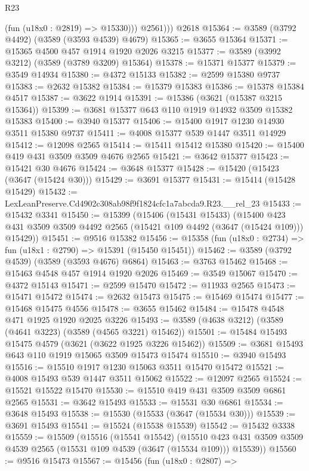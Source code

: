 \begin{lexlean}{R23}
\begin{coremodule}
            (fun (u18x0 : @2819) => @15330)))
          @2561)))
    @2618
@15364 := @3589 (@3792 @4492) (@3589 (@3593 @4539) @4679)
@15365 := @3655 @15364
@15371 := @15365 @4500 @457 @1914 @1920 @2026 @3215
@15377 := @3589 (@3992 @3212) (@3589 (@3789 @3209) @15364)
@15378 := @15371 @15377
@15379 := @3549 @14934
@15380 := @4372 @15133
@15382 := @2599 @15380 @9737
@15383 := @2632 @15382
@15384 := @15379 @15383
@15386 := @15378 @15384 @4517
@15387 := @3622 @1914
@15391 := @15386 (@3621 (@15387 @3215 @15364))
@15399 := @3681 @15377 @643 @110 @1919 @14932 @3509 @15382 @15383
@15400 := @3940 @15377
@15406 := @15400 @1917 @1230 @14930 @3511 @15380 @9737
@15411 := @4008 @15377 @539 @1447 @3511 @14929
@15412 := @12098 @2565
@15414 := @15411 @15412 @15380
@15420 := @15400 @419 @431 @3509 @3509 @4676 @2565
@15421 := @3642 @15377
@15423 := @15421 @30 @4676
@15424 := @3648 @15377
@15428 := @15420 (@15423 (@3647 (@15424 @30)))
@15429 := @3691 @15377
@15431 := @15414 (@15428 @15429)
@15432 := LexLeanPreserve.Cd4902c308ab98f9f1824cfc1a7abcda9.R23.__rel_23
@15433 := @15432 @3341
@15450 := @15399
    (@15406
      (@15431 @15433)
      (@15400 @423 @431 @3509 @3509 @4492 @2565 (@15421 @109 @4492 (@3647 (@15424 @109))) @15429))
@15451 := @9516 @15382
@15456 := @15358 (fun (u18x0 : @2734) => fun (u18x1 : @2790) => @15391 (@15450 @15451))
@15462 := @3589 (@3792 @4539) (@3589 (@3593 @4676) @6864)
@15463 := @3763 @15462
@15468 := @15463 @4548 @457 @1914 @1920 @2026
@15469 := @3549 @15067
@15470 := @4372 @15143
@15471 := @2599 @15470
@15472 := @11933 @2565
@15473 := @15471 @15472
@15474 := @2632 @15473
@15475 := @15469 @15474
@15477 := @15468 @15475 @4556
@15478 := @3655 @15462
@15484 := @15478 @4548 @471 @1925 @1920 @2025 @3226
@15493 := @3589 (@4638 @3212) (@3589 (@4641 @3223) (@3589 (@4565 @3221) @15462))
@15501 := @15484 @15493 @15475 @4579 (@3621 (@3622 @1925 @3226 @15462))
@15509 := @3681 @15493 @643 @110 @1919 @15065 @3509 @15473 @15474
@15510 := @3940 @15493
@15516 := @15510 @1917 @1230 @15063 @3511 @15470 @15472
@15521 := @4008 @15493 @539 @1447 @3511 @15062
@15522 := @12097 @2565
@15524 := @15521 @15522 @15470
@15530 := @15510 @419 @431 @3509 @3509 @6861 @2565
@15531 := @3642 @15493
@15533 := @15531 @30 @6861
@15534 := @3648 @15493
@15538 := @15530 (@15533 (@3647 (@15534 @30)))
@15539 := @3691 @15493
@15541 := @15524 (@15538 @15539)
@15542 := @15432 @3338
@15559 := @15509
    (@15516
      (@15541 @15542)
      (@15510 @423 @431 @3509 @3509 @4539 @2565 (@15531 @109 @4539 (@3647 (@15534 @109))) @15539))
@15560 := @9516 @15473
@15567 := @15456
    (fun (u18x0 : @2807) =>

\end{coremodule}
\end{lexlean}
